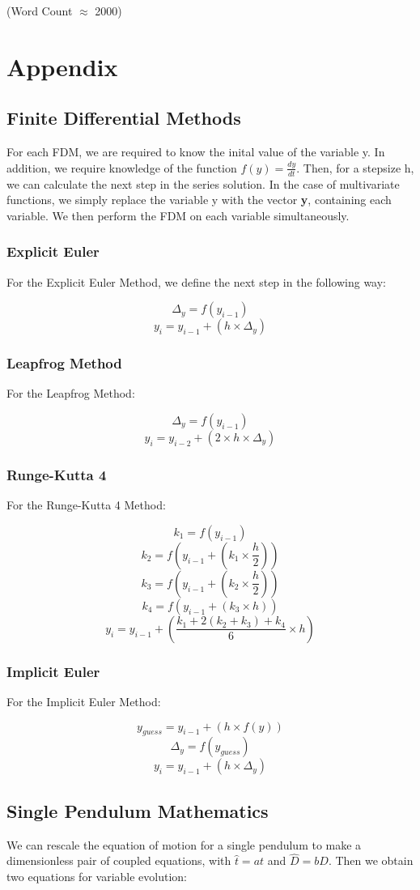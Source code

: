 \documentclass{article}
\begin{document}
(Word Count $\approx$ 2000)

\section{Appendix}
\subsection{Finite Differential Methods}
For each FDM, we are required to know the inital value of the variable y. In addition, we require knowledge of the function $f(y) = \frac{dy}{dt}$. Then, for a stepsize h, we can calculate the next step in the series solution. In the case of multivariate functions, we simply replace the variable y with the vector \textbf{y}, containing each variable. We then perform the FDM on each variable simultaneously.
\subsubsection{Explicit Euler}
For the Explicit Euler Method, we define the next step in the following way:

\[ \Delta_{y} = f(y_{i-1}) \]
\[ y_{i} = y_{i-1} + (h \times \Delta_{y}) \]

\subsubsection{Leapfrog Method}
For the Leapfrog Method:

\[ \Delta_{y} = f(y_{i-1}) \]
\[ y_{i} = y_{i-2} + (2 \times h \times \Delta_{y}) \]
\subsubsection{Runge-Kutta 4}
For the Runge-Kutta 4 Method:

\[ k_{1} = f(y_{i-1}) \]
\[ k_{2} = f(y_{i-1} + (k_{1} \times \frac{h}{2})) \]
\[ k_{3} = f(y_{i-1} + (k_{2} \times \frac{h}{2})) \]
\[ k_{4} = f(y_{i-1} + (k_{3} \times h)) \]
\[ y_{i} = y_{i-1} + (\frac{k_{1} + 2(k_{2} + k_{3}) + k_{4}}{6} \times h) \]
\subsubsection{Implicit Euler}
For the Implicit Euler Method:

\[ y_{guess} = y_{i-1} + (h \times f(y)) \]
\[ \Delta_{y} = f(y_{guess}) \]
\[ y_{i} = y_{i-1} + (h \times \Delta_{y}) \]
\subsection{Single Pendulum Mathematics}
We can rescale the equation of motion for a single pendulum to make a dimensionless pair of coupled equations, with $\hat{t} = a t$ and $\hat{D} = b D$. Then we obtain two equations for variable evolution:
\end{document}
